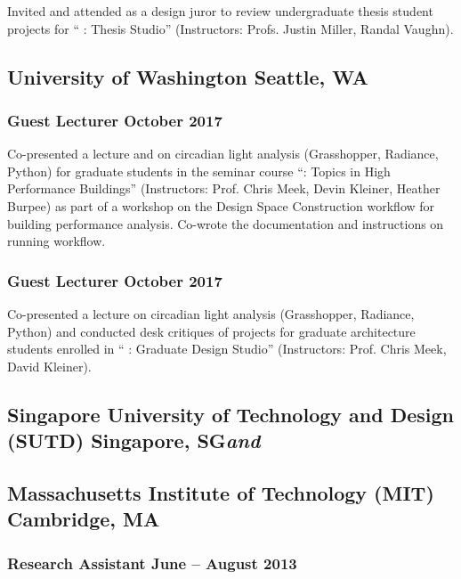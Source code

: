 \documentclass[letterpaper, oneside, 10pt]{article}
\begin{document}
Invited and attended as a design juror to review undergraduate thesis student
projects for `` : Thesis Studio'' (Instructors: Profs. Justin
Miller, Randal Vaughn).

\subsection*{University of Washington\DotSep{0.25em} Seattle, WA}

\subsubsection*{Guest Lecturer\DotSep{0.25em} October 2017}

Co-presented a lecture and on circadian light analysis (Grasshopper, Radiance,
Python) for graduate students in the seminar course ``:
Topics in High Performance Buildings'' (Instructors: Prof. Chris Meek, Devin
Kleiner, Heather Burpee) as part of a workshop on the Design Space
Construction  workflow for building performance analysis. Co-wrote
the documentation and instructions on running  workflow.

\setlength{\pagetotal}{\pagetotal - 3em}

\subsubsection*{Guest Lecturer\DotSep{0.25em} October 2017}

Co-presented a lecture on circadian light analysis (Grasshopper, Radiance,
Python) and conducted desk critiques of projects for graduate architecture
students enrolled in `` : Graduate Design Studio''
(Instructors: Prof. Chris Meek, David Kleiner).

\subsection*{%
  Singapore University of Technology and Design (SUTD)%
  \DotSep{0.25em} Singapore, SG\DotSep{0.25em}\textit{and}%
}
\subsection*{%
  Massachusetts Institute of Technology (MIT)\DotSep{0.25em} Cambridge, MA%
}

\subsubsection*{Research Assistant\DotSep{0.25em} June -- August 2013}
\end{document}
